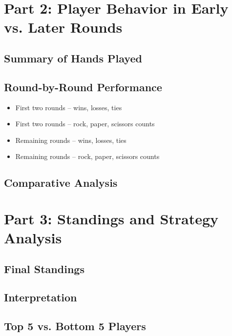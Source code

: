 \documentclass[12pt]{article}
\begin{document}
\newpage

\section*{Part 2: Player Behavior in Early vs. Later Rounds}

\subsection*{Summary of Hands Played}

\subsection*{Round-by-Round Performance}
\begin{itemize}
    \item First two rounds – wins, losses, ties
    \item First two rounds – rock, paper, scissors counts
    \item Remaining rounds – wins, losses, ties
    \item Remaining rounds – rock, paper, scissors counts
\end{itemize}

\subsection*{Comparative Analysis}

\newpage

\section*{Part 3: Standings and Strategy Analysis}

\subsection*{Final Standings}

\subsection*{Interpretation}

\subsection*{Top 5 vs. Bottom 5 Players}
\end{document}
